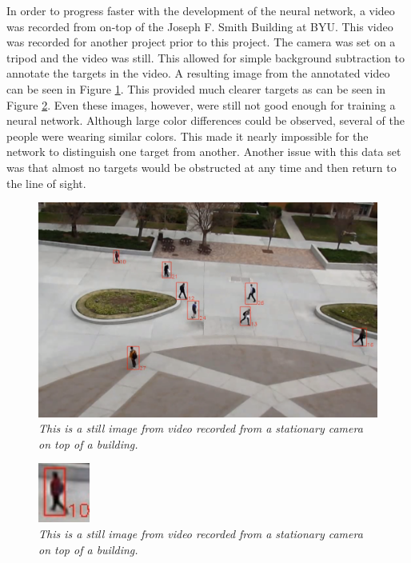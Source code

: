 \documentclass[letterpaper, 10 pt, conference]{ieeeconf}  %
\begin{document}
In order to progress faster with the development of the neural network, a video was recorded from on-top of the Joseph F. Smith Building at BYU. This video was recorded for another project prior to this project. The camera was set on a tripod and the video was still. This allowed for simple background subtraction to annotate the targets in the video. A resulting image from the annotated video can be seen in Figure \ref{fig:jfsb}. This provided much clearer targets as can be seen in Figure \ref{fig:jfsb_zoomed}. Even these images, however, were still not good enough for training a neural network. Although large color differences could be observed, several of the people were wearing similar colors. This made it nearly impossible for the network to distinguish one target from another. Another issue with this data set was that almost no targets would be obstructed at any time and then return to the line of sight.

\begin{figure}
	\begin{center}
		\includegraphics[width=.45\textwidth]{jfsb.png}
		\caption{\textit{This is a still image from video recorded from a stationary camera on top of a building.}} 
		\label{fig:jfsb}
	\end{center}
\end{figure}

\begin{figure}
	\begin{center}
		\includegraphics[width=.45\textwidth]{jfsb_zoomed.png}
		\caption{\textit{This is a still image from video recorded from a stationary camera on top of a building.}} 
		\label{fig:jfsb_zoomed}
	\end{center}
\end{figure}
\end{document}

